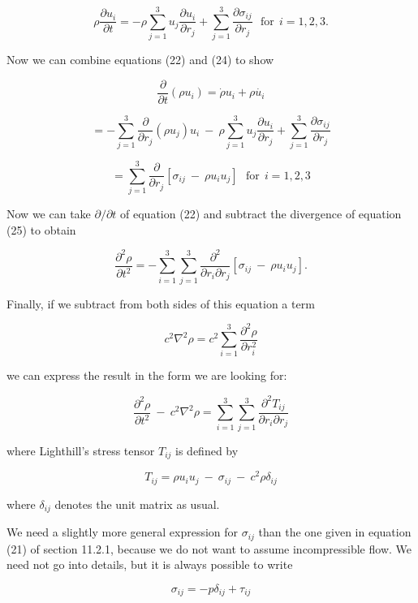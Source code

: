   $$\rho \dfrac{\partial u_i}{\partial t}=- \rho \sum_{j=1}^3{u_j 
  \dfrac{\partial u_i}{\partial r_j}} + \sum_{j=1}^3{\dfrac{\partial 
  \sigma_{ij}}{\partial r_j}}\mathrm{~~~for~~}i=1,2,3 . \tag{24}$$ 

  Now we can combine equations (22) and (24) to show 

  $$\dfrac{\partial}{\partial t}(\rho u_i) =\dot{\rho} u_i + \rho \dot{u_i}$$ 

  $$= -\sum_{j=1}^3\dfrac{\partial}{\partial r_j} \left( \rho u_j \right) u_i 
  \mathrm{~}-\mathrm{~} \rho \sum_{j=1}^3{u_j \dfrac{\partial u_i}{\partial 
  r_j}} + \sum_{j=1}^3{\dfrac{\partial \sigma_{ij}}{\partial r_j}}$$ 

  $$= \sum_{j=1}^3 \dfrac{\partial}{\partial r_j} \left[\sigma_{ij} 
  \mathrm{~}-\mathrm{~} \rho u_i u_j \right] \mathrm{~~~for~~}i=1,2,3 
  \tag{25}$$ 

  Now we can take $\partial/\partial t$ of equation (22) and subtract the 
  divergence of equation (25) to obtain 

  $$\dfrac{\partial^2 \rho}{\partial t^2} = -\sum_{i=1}^3 \sum_{j=1}^3 
  \dfrac{\partial^2}{\partial r_i \partial r_j} \left[\sigma_{ij} 
  \mathrm{~}-\mathrm{~} \rho u_i u_j \right] . \tag{26}$$ 

  Finally, if we subtract from both sides of this equation a term 

  $$c^2 \nabla^2 \rho = c^2 \sum_{i=1}^3 \dfrac{\partial^2 \rho}{\partial 
  r_i^2} \tag{27}$$ 

  we can express the result in the form we are looking for: 

  $$\dfrac{\partial^2 \rho}{\partial t^2} \mathrm{~}-\mathrm{~} c^2 \nabla^2 
  \rho = \sum_{i=1}^3 \sum_{j=1}^3 \dfrac{\partial^2 T_{ij}}{\partial r_i 
  \partial r_j} \tag{28}$$ 

  where Lighthill's stress tensor $T_{ij}$ is defined by 

  $$T_{ij} = \rho u_i u_j \mathrm{~}-\mathrm{~} \sigma_{ij} 
  \mathrm{~}-\mathrm{~} c^2 \rho \delta_{ij} \tag{29}$$ 

  where $\delta_{ij}$ denotes the unit matrix as usual. 

  We need a slightly more general expression for $\sigma_{ij}$ than the one 
  given in equation (21) of section 11.2.1, because we do not want to assume 
  incompressible flow. We need not go into details, but it is always possible 
  to write 

  $$\sigma_{ij} = -p \delta_{ij} + \tau_{ij} \tag{30}$$ 

